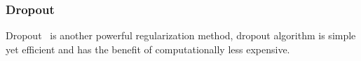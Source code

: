 \subsubsection{Dropout}

Dropout~\cite{JMLR:v15:srivastava14a} is another powerful regularization method, dropout algorithm is simple yet efficient and has the benefit of   computationally less expensive. 